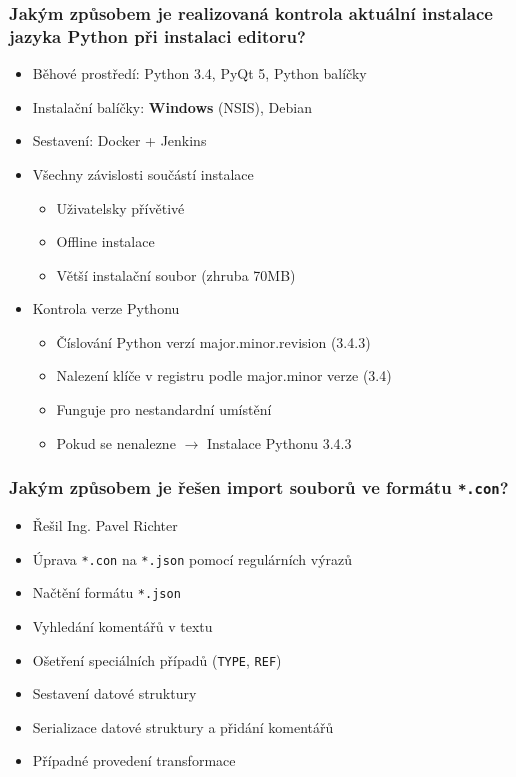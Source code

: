 \begin{frame}[noframenumbering]
\begin{center}
	\frametitle{Jakým způsobem je realizovaná kontrola aktuální instalace jazyka Python při instalaci editoru?}
	\begin{itemize}[<+->]
		\item Běhové prostředí: Python 3.4, PyQt 5, Python balíčky
		\item Instalační balíčky: \textbf{Windows} (NSIS), Debian
		\item Sestavení: Docker + Jenkins
		\item Všechny závislosti součástí instalace
		\begin{itemize}
			\item Uživatelsky přívětivé
			\item Offline instalace
			\item Větší instalační soubor (zhruba 70MB)
		\end{itemize}
		\item Kontrola verze Pythonu
		\begin{itemize}
			\item Číslování Python verzí major.minor.revision (3.4.3)
			\item Nalezení klíče v registru podle major.minor verze (3.4)
			\item Funguje pro nestandardní umístění
			\item Pokud se nenalezne $\rightarrow$ Instalace Pythonu 3.4.3
		\end{itemize}
	\end{itemize}
\end{center}
\end{frame}

\begin{frame}[noframenumbering]
\begin{center}
	\frametitle{Jakým způsobem je řešen import souborů ve formátu \texttt{*.con}?}
	\begin{itemize}[<+->]
		\item Řešil Ing. Pavel Richter
		\item Úprava \texttt{*.con} na \texttt{*.json} pomocí regulárních výrazů
		\item Načtění formátu \texttt{*.json}
		\item Vyhledání komentářů v textu
		\item Ošetření speciálních případů (\texttt{TYPE}, \texttt{REF})
		\item Sestavení datové struktury
		\item Serializace datové struktury a přidání komentářů
		\item Případné provedení transformace
	\end{itemize}
\end{center}
\end{frame}

